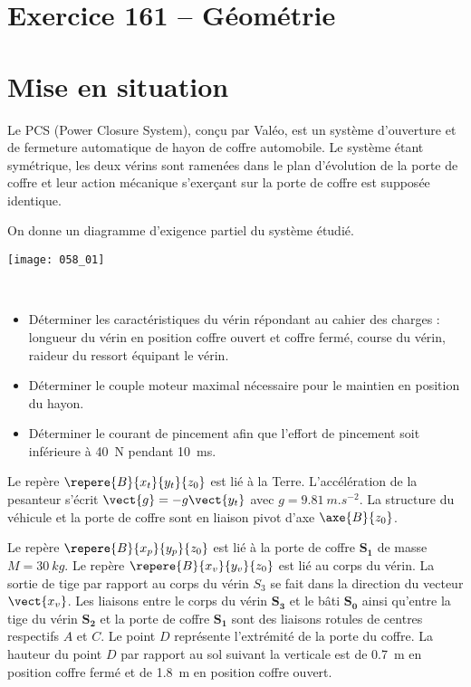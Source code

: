 \section*{Exercice 161 -- Géométrie}

\setcounter{exo}{0}

\section*{Mise en situation}
\ifprof
\else
Le PCS (Power Closure System), conçu par Valéo, est un système d’ouverture et de fermeture automatique de
hayon de coffre automobile.
Le système étant symétrique, les deux vérins sont ramenées dans 
le plan d’évolution de la porte de coffre et leur action mécanique s’exerçant sur la porte de coffre est supposée identique.

On donne un diagramme d'exigence partiel du système étudié. 

\begin{center}
\texttt{[image: 058\_01]}
\end{center}


\begin{obj}~\\
\begin{itemize}
\item Déterminer les caractéristiques du vérin répondant au cahier des charges : longueur
du vérin en position coffre ouvert et coffre fermé, course du vérin, raideur du ressort équipant le vérin. 
\item Déterminer le couple moteur maximal nécessaire pour le maintien en position du hayon.
\item Déterminer le courant de pincement afin que l'effort de pincement soit inférieure à \SI{40}{N} pendant \SI{10}{ms}.
\end{itemize}
\end{obj}




Le repère $\repere{B}{x_t}{y_t}{z_0}$ est lié à la Terre. L’accélération de la pesanteur s’écrit $\vect{g}=-g\vect{y_t}$ avec $g=\SI{9,81}{m.s^{-2}}$. La structure du véhicule et la porte de coffre sont en liaison pivot d’axe $\axe{B}{z_0}$.

Le repère $\repere{B}{x_p}{y_p}{z_0}$ est lié à la porte de coffre \textbf{$\bm{S_1}$} de masse $M=\SI{30}{kg}$. Le repère $\repere{B}{x_v}{y_v}{z_0}$ est lié au corps du vérin. La sortie
de tige par rapport au corps du vérin \textbf{$S_3$} se fait dans la direction du vecteur $\vect{x_v}$.
Les liaisons entre le corps du vérin \textbf{$\bm{S_3}$} et le bâti \textbf{$\bm{S_0}$} ainsi qu'entre la tige du vérin \textbf{$\bm{S_2}$} et la porte de coffre \textbf{$\bm{S_1}$} sont des liaisons rotules de centres respectifs $A$ et $C$.
Le point $D$ représente l’extrémité de la porte du coffre. La hauteur du point $D$ par rapport au sol suivant la
verticale est de \SI{0,7}{m} en position coffre fermé et de \SI{1,8}{m} en position coffre ouvert.

